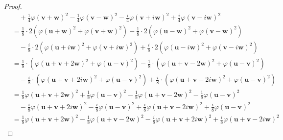 \documentclass[dvipdfmx]{jsarticle}
\begin{document}
\begin{proof}
\begin{align*}
&\quad + \frac{1}{4}{\varphi\left( \mathbf{v} + \mathbf{w} \right)}^{2} - \frac{1}{4}{\varphi\left( \mathbf{v} - \mathbf{w} \right)}^{2} - \frac{i}{4}{\varphi\left( \mathbf{v} + i\mathbf{w} \right)}^{2} + \frac{i}{4}{\varphi\left( \mathbf{v} - i\mathbf{w} \right)}^{2}\\
&= \frac{1}{8} \cdot 2\left( {\varphi\left( \mathbf{u} + \mathbf{w} \right)}^{2} + {\varphi\left( \mathbf{v} + \mathbf{w} \right)}^{2} \right) - \frac{1}{8} \cdot 2\left( {\varphi\left( \mathbf{u} - \mathbf{w} \right)}^{2} + {\varphi\left( \mathbf{v} - \mathbf{w} \right)}^{2} \right) \\
&\quad - \frac{i}{8} \cdot 2\left( {\varphi\left( \mathbf{u} + i\mathbf{w} \right)}^{2} + {\varphi\left( \mathbf{v} + i\mathbf{w} \right)}^{2} \right) + \frac{i}{8} \cdot 2\left( {\varphi\left( \mathbf{u} - i\mathbf{w} \right)}^{2} + {\varphi\left( \mathbf{v} - i\mathbf{w} \right)}^{2} \right)\\
&= \frac{1}{8} \cdot \left( {\varphi\left( \mathbf{u} + \mathbf{v} + 2\mathbf{w} \right)}^{2} + {\varphi\left( \mathbf{u} - \mathbf{v} \right)}^{2} \right) - \frac{1}{8} \cdot \left( {\varphi\left( \mathbf{u} + \mathbf{v} - 2\mathbf{w} \right)}^{2} + {\varphi\left( \mathbf{u} - \mathbf{v} \right)}^{2} \right) \\
&\quad - \frac{i}{8} \cdot \left( {\varphi\left( \mathbf{u} + \mathbf{v} + 2i\mathbf{w} \right)}^{2} + {\varphi\left( \mathbf{u} - \mathbf{v} \right)}^{2} \right) + \frac{i}{8} \cdot \left( {\varphi\left( \mathbf{u} + \mathbf{v} - 2i\mathbf{w} \right)}^{2} + {\varphi\left( \mathbf{u} - \mathbf{v} \right)}^{2} \right)\\
&= \frac{1}{8}{\varphi\left( \mathbf{u} + \mathbf{v} + 2\mathbf{w} \right)}^{2} + \frac{1}{8}{\varphi\left( \mathbf{u} - \mathbf{v} \right)}^{2} - \frac{1}{8}{\varphi\left( \mathbf{u} + \mathbf{v} - 2\mathbf{w} \right)}^{2} - \frac{1}{8}{\varphi\left( \mathbf{u} - \mathbf{v} \right)}^{2} \\
&\quad - \frac{i}{8}{\varphi\left( \mathbf{u} + \mathbf{v} + 2i\mathbf{w} \right)}^{2} - \frac{i}{8}{\varphi\left( \mathbf{u} - \mathbf{v} \right)}^{2} + \frac{i}{8}{\varphi\left( \mathbf{u} + \mathbf{v} - 2i\mathbf{w} \right)}^{2} + \frac{i}{8}{\varphi\left( \mathbf{u} - \mathbf{v} \right)}^{2}\\
&= \frac{1}{8}{\varphi\left( \mathbf{u} + \mathbf{v} + 2\mathbf{w} \right)}^{2} - \frac{1}{8}{\varphi\left( \mathbf{u} + \mathbf{v} - 2\mathbf{w} \right)}^{2} - \frac{i}{8}{\varphi\left( \mathbf{u} + \mathbf{v} + 2i\mathbf{w} \right)}^{2} + \frac{i}{8}{\varphi\left( \mathbf{u} + \mathbf{v} - 2i\mathbf{w} \right)}^{2}\\

\end{align*}
\end{proof}
\end{document}
